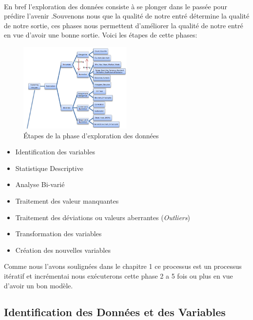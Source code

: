\paragraph{}
En bref l'exploration des données consiste à se plonger dans le passée
pour prédire l'avenir .Souvenons nous que la qualité de notre entré
détermine la qualité de notre sortie, ces phases nous permettent
d'améliorer la qualité de notre entré en vue d'avoir une bonne sortie.
Voici les étapes de cette phases:
\begin{figure}[ht]
	\centering
	\includegraphics[width=0.5\textwidth]{fig/Exploration.png}
	\caption[Short caption]{Étapes de la phase d'exploration des données }
	\label{fig:imageExpSt}
\end{figure} 
\begin{itemize}
\item
  Identification des variables
\item
  Statistique Descriptive
\item
  Analyse Bi-varié
\item
  Traitement des valeur manquantes
\item
  Traitement des déviations  ou valeurs aberrantes (\emph{Outliers})  
\item
  Transformation des variables
\item
  Création des nouvelles variables
\end{itemize}
Comme nous l'avons soulignées dans le chapitre 1 ce processus est un
processus itératif et incrémentai nous exécuterons cette phase 2 a 5 fois ou plus en vue d'avoir un bon modèle.
\subsection{Identification des Données et des Variables}
